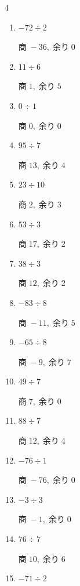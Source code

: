 \begin{multicols}{4}
\begin{enumerate}
  \item $-72 \div 2$

        $商\; -36,\; 余り\; 0$

  \item $11 \div 6$

        $商\; 1,\; 余り\; 5$

  \item $0 \div 1$

        $商\; 0,\; 余り\; 0$

  \item $95 \div 7$

        $商\; 13,\; 余り\; 4$

  \item $23 \div 10$

        $商\; 2,\; 余り\; 3$

  \item $53 \div 3$

        $商\; 17,\; 余り\; 2$

  \item $38 \div 3$

        $商\; 12,\; 余り\; 2$

\columnbreak %

\resetques

  \item $-83 \div 8$

        $商\; -11,\; 余り\; 5$

  \item $-65 \div 8$

        $商\; -9,\; 余り\; 7$

  \item $49 \div 7$

        $商\; 7,\; 余り\; 0$

  \item $88 \div 7$

        $商\; 12,\; 余り\; 4$

  \item $-76 \div 1$

        $商\; -76,\; 余り\; 0$

  \item $-3 \div 3$

        $商\; -1,\; 余り\; 0$

  \item $76 \div 7$

        $商\; 10,\; 余り\; 6$

  \item $-71 \div 2$


\end{enumerate}
\end{multicols}
